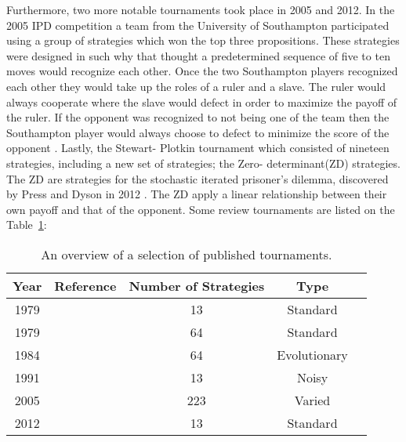 Furthermore, two more notable tournaments took place in 2005 and 2012.
In the 2005 IPD competition a team from the University of Southampton participated
using a group of strategies which won the top three propositions. These strategies
were designed in such why that thought a predetermined sequence of five to ten
moves would recognize each other. Once the two Southampton players recognized
each other they would take up the roles of a ruler and a slave. The ruler
would always cooperate where the slave would defect in order to maximize the
payoff of the ruler. If the opponent was recognized to not being one of the team
then the Southampton player would always choose to defect to minimize the score
of the opponent \cite{Li2011}. Lastly, the Stewart- Plotkin \cite{Stewart2012}
tournament which
consisted of nineteen strategies, including a new set of strategies; the Zero-
determinant(ZD) strategies. The ZD are strategies for the stochastic iterated
prisoner's dilemma, discovered by Press and Dyson in 2012 \cite{Press2012a}.
The ZD apply a linear relationship between their own payoff and that of the opponent.
Some review tournaments are listed on the Table~\ref{tab:tournaments}:

\begin{table}[!hbtp]
    \begin{center}
        \begin{tabular}{ccccc}
            \toprule
            Year     & Reference                  & Number of Strategies & Type     \\
            \midrule
            1979     & \cite{Axelrod1980a}        & 13                   & Standard  \\
            1979     & \cite{Axelrod1980b}        & 64                   & Standard  \\
            1984     & \cite{Axelrod1981}         & 64                   & Evolutionary\\
            1991     & \cite{The2016}             & 13                   & Noisy     \\
            2005     & \cite{Chong2004}           & 223                  & Varied    \\
            2012     & \cite{Stewart2012}         & 13                   & Standard   \\
            \bottomrule
        \end{tabular}
    \end{center}
    \caption{An overview of a selection of published tournaments.}\label{tab:tournaments}
\end{table}

